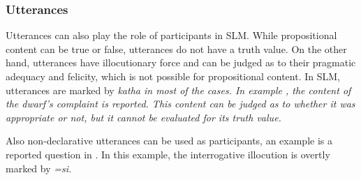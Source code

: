 %



\subsubsection{Utterances}\label{sec:func:Utterances}
Utterances can also play the role of participants in SLM.   While propositional content can be true or false, utterances do not have a truth value. On the other hand, utterances have illocutionary force and can be judged as to their pragmatic adequacy and felicity, which is not possible for propositional content. In SLM, utterances are marked by \em katha \em in most of the cases. In example , the content of the dwarf's complaint is reported. This content can be judged as to whether it was appropriate or not, but it cannot be evaluated for its truth value.


Also non-declarative utterances can be used as participants, an example is a reported question in .
In this example, the interrogative illocution is overtly marked by \em =si\em.

